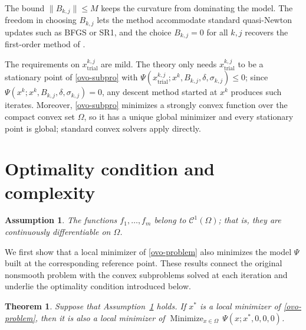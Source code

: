 \documentclass[11pt]{article}
\newcommand{\xkjtrial}{x^{k,j}_{\mathrm{trial}}}
\newcommand{\minimize}{\mathop{\text{Minimize}}}
\newtheorem{theorem}{Theorem}[section]
\newtheorem{assumption}{Assumption}
\begin{document}
The bound $\|B_{k,j}\| \leq M$ keeps the curvature from dominating the model.
The freedom in choosing $B_{k,j}$ lets the method accommodate standard
quasi-Newton updates such as BFGS or SR1, and the choice $B_{k,j} = 0$ for all
$k, j$ recovers the first-order method of \cite{alvarezovo}.

The requirements on $\xkjtrial$ are mild. The theory only needs $\xkjtrial$ to
be a stationary point of \eqref{ovo-subpro} with
$\Psi(\xkjtrial; x^k, B_{k,j}, \delta, \sigma_{k,j}) \leq 0$; since
$\Psi(x^k; x^k, B_{k,j}, \delta, \sigma_{k,j}) = 0$, any descent method started
at $x^k$ produces such iterates. Moreover, \eqref{ovo-subpro} minimizes a
strongly convex function over the compact convex set $\Omega$, so it has a
unique global minimizer and every stationary point is global; standard convex
solvers apply directly.

\section{Optimality condition and complexity} \label{sec:complexity}

\begin{assumption} \label{a1}
The functions $f_1, \ldots, f_m$ belong to $\mathcal{C}^1(\Omega)$; that is,
they are continuously differentiable on $\Omega$.
\end{assumption}

We first show that a local minimizer of \eqref{ovo-problem} also minimizes the
model $\Psi$ built at the corresponding reference point. These results connect
the original nonsmooth problem with the convex subproblems solved at each
iteration and underlie the optimality condition introduced below.

\begin{theorem} \label{teo:conv1}
Suppose that Assumption~\ref{a1} holds. If $x^*$ is a local minimizer of
\eqref{ovo-problem}, then it is also a local minimizer of
$\minimize_{x \in \Omega}\, \Psi(x; x^*, 0, 0, 0)$.
\end{theorem}
\end{document}
